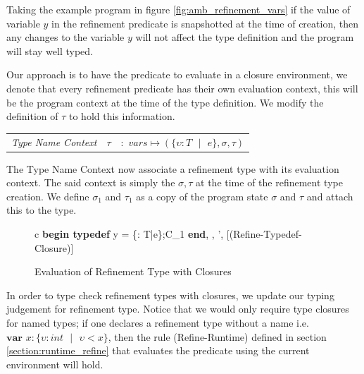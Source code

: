 \documentclass[a4paper,12pt]{report}
\begin{document}
\par
Taking the example program in figure \ref{fig:amb_refinement_vars} if the 
value of variable $y$ in the refinement predicate is snapshotted at the time of 
creation, then any changes to the variable $y$ will not 
affect the type definition and the program will stay well typed.

\par
Our approach is to have the predicate to evaluate in a closure environment, we 
denote that every refinement predicate has their own evaluation context, this 
will be the program context at the time of the type definition. We modify the 
definition of $\tau$ to hold this information.

\begin{center}
   \begin{tabular} {c c c}
     \textit{Type Name Context} & $\tau$& $:$ 
     $vars \mapsto (\{\upsilon : T\text{ }|\text{ }e\}, \sigma, \tau)$ \\
   \end{tabular}
\end{center}

The Type Name Context now associate a refinement type with its 
evaluation context. The said context is simply the $\sigma, \tau$ at the time of 
the refinement type creation. 
We define $\sigma_1$ and $\tau_1$ as a copy of the program state $\sigma$ and 
$\tau$ and attach this to the type. 

\begin{figure}[H]
  \begin{center}
    \begin{tabular} {c}
      {\langle\textbf{begin typedef } y = \{\upsilon : T\text{ }|\text{ }e\};C_1\textbf{ end}, 
      \sigma, \tau \rangle \longrightarrow \langle \sigma', \tau \rangle} [(Refine-Typedef-Closure)]
    \end{tabular}
  \end{center}
  \caption{Evaluation of Refinement Type with Closures}
\end{figure}

\par
In order to type check refinement types with closures, we update our typing 
judgement for refinement type. Notice that we would only require type 
closures for named types; if one declares a refinement type without a name i.e.  
$\textbf{var }x : \{\upsilon : int\text{ }|\text{ }\upsilon < x\}$, then the rule 
(Refine-Runtime) defined in section \ref{section:runtime_refine} that evaluates 
the predicate using the current environment will hold. 
\end{document}

